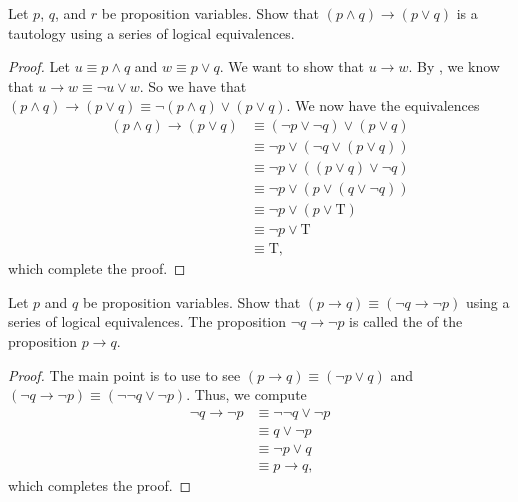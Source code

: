 \documentclass[../notes.tex]{subfiles}
\begin{document}
\begin{example}
    Let $p$, $q$, and $r$ be proposition variables. Show that $(p \land q) \rightarrow (p \lor q )$ is a tautology using a series of logical equivalences.
\end{example}
\begin{proof}
    Let $u \equiv p \land q$ and $w \equiv p \lor q$. We want to show that $u \rightarrow w$. By , we know that $u \rightarrow w \equiv \neg u \lor w.$ So we have that $(p \land q) \rightarrow (p \lor q ) \equiv \neg(p \land q) \lor (p \lor q )$. We now have the equivalences
    \begin{align*}
        (p \land q) \rightarrow (p \lor q ) &\equiv (\neg p \lor \neg q) \lor (p \lor q ) \tag{De Morgan's Laws} \\
        &\equiv \neg p \lor (\neg q \lor (p \lor q )) \tag{Associative Laws} \\
        &\equiv \neg p \lor ( (p \lor q )\lor \neg q) \tag{Commutative Laws} \\
        &\equiv \neg p \lor ( p \lor (q \lor \neg q)) \tag{Associative Laws} \\
        &\equiv \neg p \lor ( p \lor \text{T}) \tag{Negation Laws} \\
        &\equiv \neg p \lor \text{T} \tag{Negation Laws} \\
        &\equiv \text{T} \tag{Negation Laws},
    \end{align*}
    which complete the proof.
\end{proof}
\begin{example}[contraposition] \label{exe:contraposition}
    Let $p$ and $q$ be proposition variables. Show that $(p\to q)\equiv(\lnot q\to\lnot p)$ using a series of logical equivalences. The proposition $\lnot q\to\lnot p$ is called the  of the proposition $p\to q$.
\end{example}
\begin{proof}
    The main point is to use  to see $(p\to q)\equiv(\lnot p\lor q)$ and $(\lnot q\to\lnot p)\equiv(\lnot\lnot q\lor\lnot p)$. Thus, we compute
    \begin{align*}
        \lnot q\to\lnot p &\equiv \lnot\lnot q\lor\lnot p \\
        &\equiv q\lor\lnot p \tag{Double Negation Law} \\
        &\equiv \lnot p\lor q \tag{Commutative Laws} \\
        &\equiv p\to q,
    \end{align*}
    which completes the proof.
\end{proof}
\end{document}
